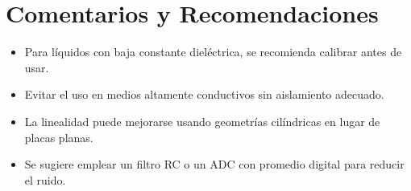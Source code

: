 \documentclass[10pt]{datasheet}
\begin{document}
\section{Comentarios y Recomendaciones}
\begin{itemize}
    \item Para líquidos con baja constante dieléctrica, se recomienda calibrar antes de usar.  
    \item Evitar el uso en medios altamente conductivos sin aislamiento adecuado.  
    \item La linealidad puede mejorarse usando geometrías cilíndricas en lugar de placas planas.  
    \item Se sugiere emplear un filtro RC o un ADC con promedio digital para reducir el ruido.  
\end{itemize}
\end{document}
